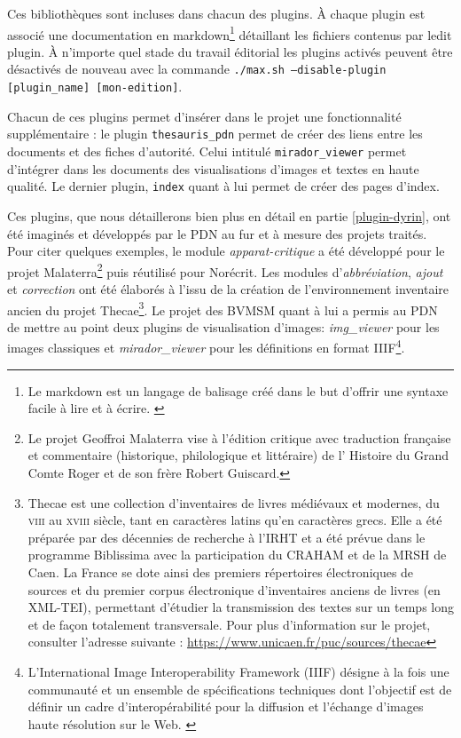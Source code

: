 \documentclass[a4paper,12pt,twoside]{book}
\begin{document}
Ces bibliothèques sont incluses dans chacun des plugins.
À chaque plugin est associé une documentation en markdown\footnote{Le markdown est un langage de balisage créé dans le but d'offrir une syntaxe facile à lire et à écrire. \cite{markdown}} détaillant les fichiers contenus par ledit plugin.
À n'importe quel stade du travail éditorial les plugins activés peuvent être désactivés de nouveau avec la commande \texttt{./max.sh --disable-plugin [plugin\_name] [mon-edition]}.

Chacun de ces plugins permet d'insérer dans le projet une fonctionnalité supplémentaire : le plugin \texttt{thesauris\_pdn} permet de créer des liens entre les documents et des fiches d'autorité. Celui intitulé \texttt{mirador\_viewer} permet d'intégrer dans les documents des visualisations d'images et textes en haute qualité. Le dernier plugin, \texttt{index} quant à lui permet de créer des pages d'index.

Ces plugins, que nous détaillerons bien plus en détail en partie \ref{plugin-dyrin}, ont été imaginés et développés par le \acrshort{PDN} au fur et à mesure des projets traités. Pour citer quelques exemples, le module \textit{apparat-critique} a été développé pour le projet Malaterra\footnote{Le projet Geoffroi  Malaterra vise à l'édition critique avec traduction française et commentaire (historique, philologique et littéraire) de l' Histoire du Grand Comte Roger et de son frère Robert Guiscard.} puis réutilisé pour Norécrit. Les modules d'\textit{abbréviation}, \textit{ajout} et \textit{correction} ont été élaborés à l'issu de la création de l'environnement inventaire ancien du projet Thecae\footnote{Thecae est une collection d'inventaires de livres médiévaux et modernes, du \textsc{viii}\ieme{} au \textsc{xviii}\ieme{} siècle, tant en caractères latins qu'en caractères grecs. Elle a été préparée par des décennies de recherche à l'IRHT et a été prévue dans le programme Biblissima avec la participation du \acrshort{CRAHAM} et de la \acrshort{MRSH} de Caen. La France se dote ainsi des premiers répertoires électroniques de sources et du premier corpus électronique d'inventaires anciens de livres (en XML-TEI), permettant d'étudier la transmission des textes sur un temps long et de façon totalement transversale. Pour plus d'information sur le projet, consulter l'adresse suivante : \url{https://www.unicaen.fr/puc/sources/thecae}\label{thecae}}. Le projet des \acrshort{BVMSM} quant à lui a permis au \acrshort{PDN} de mettre au point deux plugins de visualisation d'images: \textit{img\_viewer} pour les images classiques et \textit{mirador\_viewer} pour les définitions en format \acrshort{IIIF}\footnote{L'International Image Interoperability Framework (IIIF) désigne à la fois une communauté et un ensemble de spécifications techniques dont l'objectif est de définir un cadre d'interopérabilité pour la diffusion et l'échange d'images haute résolution sur le Web. \cite{iiif-intro}}.
\end{document}

